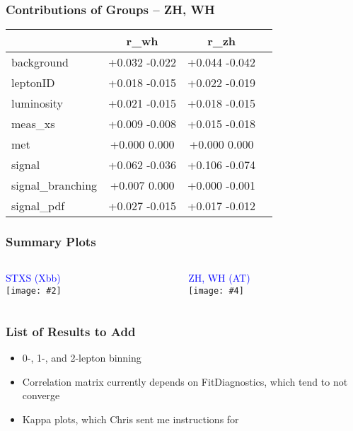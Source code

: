 \documentclass{beamer}
\newcommand{\beginbackup}{
  \newcounter{framenumbervorappendix}
  \setcounter{framenumbervorappendix}{\value{framenumber}}
}
\newcommand{\backupend}{
  \addtocounter{framenumbervorappendix}{-\value{framenumber}}
  \addtocounter{framenumber}{\value{framenumbervorappendix}}
}
\newcommand{\twofigs}[4]{
  \begin{columns}
    \begin{column}{0.5\linewidth}
      \centering
      \textcolor{blue}{#1} \\
      \texttt{[image: \#2]}
    \end{column}
    \begin{column}{0.5\linewidth}
      \centering
      \textcolor{blue}{#3} \\
      \texttt{[image: \#4]}
    \end{column}
  \end{columns}
}
\begin{document}
\begin{frame}
  \frametitle{Contributions of Groups -- ZH, WH}

  \centering
  \begin{tabular}{|l|c|c|c|}
\hline
& r\_wh & r\_zh\\
\hline
background & +0.032  -0.022 & +0.044  -0.042\\
leptonID & +0.018  -0.015 & +0.022  -0.019\\
luminosity & +0.021  -0.015 & +0.018  -0.015\\
meas\_xs & +0.009  -0.008 & +0.015  -0.018\\
met & +0.000  0.000 & +0.000  0.000\\
signal & +0.062  -0.036 & +0.106  -0.074\\
signal\_branching & +0.007  0.000 & +0.000  -0.001\\
signal\_pdf & +0.027  -0.015 & +0.017  -0.012\\
\hline
  \end{tabular}

\end{frame}

\begin{frame}
  \frametitle{Summary Plots}

  \twofigs{STXS (Xbb)}
          {201023_STXSfine_Xbb_nobtag_f8c96d5f_0d357869/summary_stxs.pdf}
          {ZH, WH (AT)}
          {201026_vh_AT_nobtag_70c6808f_0d357869/summary_stxs.pdf}

\end{frame}

\begin{frame}
  \frametitle{List of Results to Add}

  \begin{itemize}
  \item 0-, 1-, and 2-lepton binning
  \item Correlation matrix currently depends on FitDiagnostics,
    which tend to not converge
  \item Kappa plots, which Chris sent me instructions for
  \end{itemize}

\end{frame}

\begin{comment}
\beginbackup

\begin{frame}
  \centering
    {\Huge \bf\sffamily Backup Slides}
\end{frame}



\backupend
\end{comment}
\end{document}

